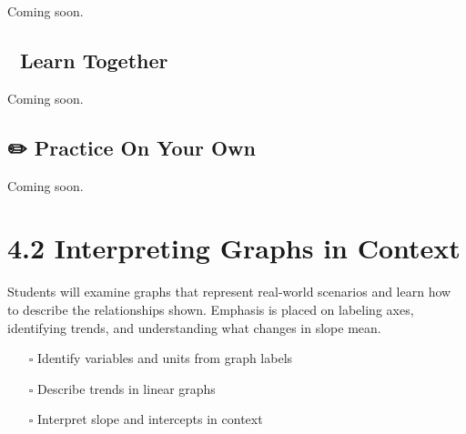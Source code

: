 \documentclass[
  letterpaper,
]{scrrept}
\providecommand{\tightlist}{%
  \setlength{\itemsep}{0pt}\setlength{\parskip}{0pt}}
\begin{document}

Coming soon.

\section*{🧠 Learn Together}\label{learn-together-16}


Coming soon.

\section*{✏️ Practice On Your Own}\label{practice-on-your-own-16}


Coming soon.

\chapter*{4.2 Interpreting Graphs in
Context}\label{interpreting-graphs-in-context-1}


Students will examine graphs that represent real-world scenarios and
learn how to describe the relationships shown. Emphasis is placed on
labeling axes, identifying trends, and understanding what changes in
slope mean.

\begin{tcolorbox}[enhanced jigsaw, colframe=quarto-callout-note-color-frame, opacitybacktitle=0.6, arc=.35mm, coltitle=black, leftrule=.75mm, toprule=.15mm, opacityback=0, bottomrule=.15mm, breakable, title={🎯 Objectives}, colback=white, bottomtitle=1mm, toptitle=1mm, titlerule=0mm, rightrule=.15mm, left=2mm, colbacktitle=quarto-callout-note-color!10!white]

\begin{itemize}
\tightlist
\item[$\square$]
  Identify variables and units from graph labels
\item[$\square$]
  Describe trends in linear graphs
\item[$\square$]
  Interpret slope and intercepts in context
\end{itemize}

\end{tcolorbox}
\end{document}
